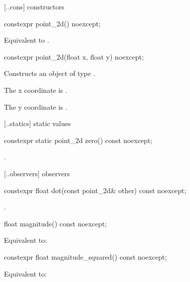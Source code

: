  [\iotwod.\pointtwod.cons] { constructors}

%
\begin{itemdecl}
constexpr point_2d() noexcept;
\end{itemdecl}
\begin{itemdescr}
\pnum
\effects
Equivalent to .
\end{itemdescr}

%
\begin{itemdecl}
constexpr point_2d(float x, float y) noexcept;
\end{itemdecl}
\begin{itemdescr}
\pnum
\effects
Constructs an object of type .

\pnum
The x coordinate is .

\pnum
The y coordinate is .
\end{itemdescr}

 [\iotwod.\pointtwod.statics] { static values}

%
\begin{itemdecl}
constexpr static point_2d zero() const noexcept;
\end{itemdecl}
\begin{itemdescr}
\pnum
\returns
{}.
\end{itemdescr}

 [\iotwod.\pointtwod.observers]{ observers}

%
\begin{itemdecl}
constexpr float dot(const point_2d& other) const noexcept;
\end{itemdecl}
\begin{itemdescr}
\pnum
\returns
{}.
\end{itemdescr}

%
\begin{itemdecl}
float magnitude() const noexcept;
\end{itemdecl}
\begin{itemdescr}
\pnum
\returns
Equivalent to: 
\end{itemdescr}

%
\begin{itemdecl}
constexpr float magnitude_squared() const noexcept;
\end{itemdecl}
\begin{itemdescr}
\pnum
\returns
Equivalent to: 
\end{itemdescr}

